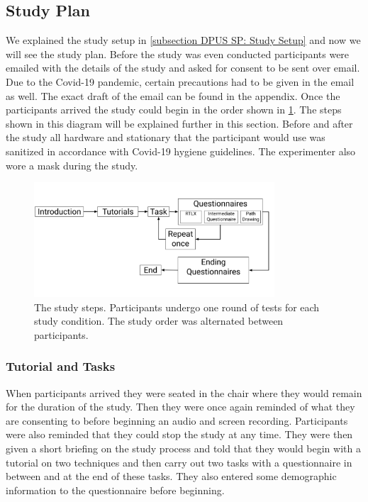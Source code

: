 \subsection{Study Plan}
\label{subsection DPUS SP: Study Plan}
We explained the study setup in \cref{subsection DPUS SP: Study Setup} and now we will see the study plan. Before the study was even conducted participants were emailed with the details of the study and asked for consent to be sent over email. Due to the Covid-19 pandemic, certain precautions had to be given in the email as well. The exact draft of the email can be found in the appendix. Once the participants arrived the study could begin in the order shown in \cref{fig:study-plan}. The steps shown in this diagram will be explained further in this section. Before and after the study all hardware and stationary that the participant would use was sanitized in accordance with Covid-19 hygiene guidelines. The experimenter also wore a mask during the study.

\begin{figure}[]
	\centering
	\includegraphics[width=0.8\textwidth]{images/study-plan.pdf}
	\caption{The study steps. Participants undergo one round of tests for each study condition. The study order was alternated between participants.}
	\label{fig:study-plan}
\end{figure}

\subsubsection{Tutorial and Tasks}
\label{subsubsection DPUS SP SP: Tutorial and Tasks}
When participants arrived they were seated in the chair where they would remain for the duration of the study. Then they were once again reminded of what they are consenting to before beginning an audio and screen recording. Participants were also reminded that they could stop the study at any time. They were then given a short briefing on the study process and told that they would begin with a tutorial on two techniques and then carry out two tasks with a questionnaire in between and at the end of these tasks. They also entered some demographic information to the questionnaire before beginning.

